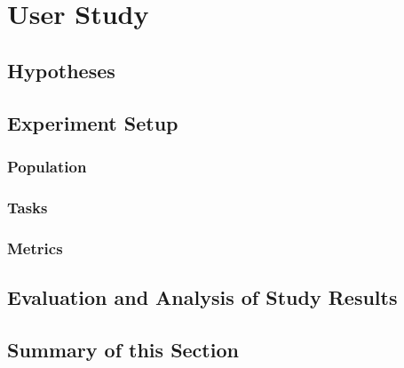 \section{User Study}

\subsection{Hypotheses}
\subsection{Experiment Setup}
\subsubsection{Population}
\subsubsection{Tasks}
\subsubsection{Metrics}
\subsection{Evaluation and Analysis of Study Results}

\subsection{Summary of this Section}
